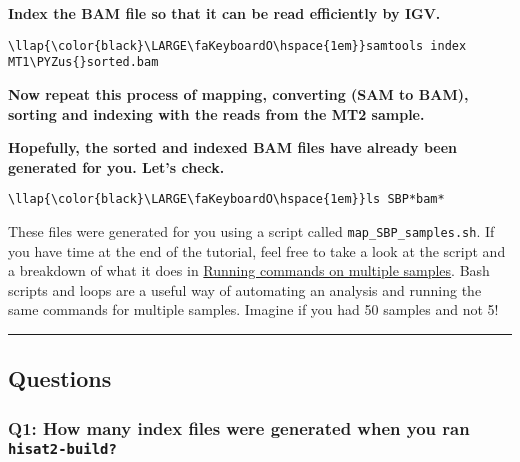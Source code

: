 \documentclass[11pt]{article}
\def\PYZus{\char`\_}
\begin{document}
    \textbf{Index the BAM file so that it can be read efficiently by IGV.}





\begin{terminalinput}
\begin{Verbatim}[commandchars=\\\{\}]
\llap{\color{black}\LARGE\faKeyboardO\hspace{1em}}samtools index MT1\PYZus{}sorted.bam
\end{Verbatim}
\end{terminalinput}



    \textbf{Now repeat this process of mapping, converting (SAM to BAM),
sorting and indexing with the reads from the MT2 sample.}

    \textbf{Hopefully, the sorted and indexed BAM files have already been
generated for you. Let's check.}





\begin{terminalinput}
\begin{Verbatim}[commandchars=\\\{\}]
\llap{\color{black}\LARGE\faKeyboardO\hspace{1em}}ls SBP*bam*
\end{Verbatim}
\end{terminalinput}



    These files were generated for you using a script called
\texttt{map\_SBP\_samples.sh}. If you have time at the end of the tutorial, feel free to take a look at
the script and a breakdown of what it does in
\href{running-commands-on-multiple-samples.ipynb}{Running commands on
multiple samples}. Bash scripts and loops are a useful way of automating
an analysis and running the same commands for multiple samples. Imagine
if you had 50 samples and not 5!

    \begin{center}\rule{0.5\linewidth}{.4pt}\end{center}

    \hypertarget{questions}{%
\subsection{Questions}\label{questions}}

    \hypertarget{q1-how-many-index-files-were-generated-when-you-ran-hisat2-build}{%
\subsubsection{\texorpdfstring{Q1: How many index files were generated
when you ran
\texttt{hisat2-build?}}{Q1: How many index files were generated when you ran hisat2-build?}}\label{q1-how-many-index-files-were-generated-when-you-ran-hisat2-build}}
\end{document}
